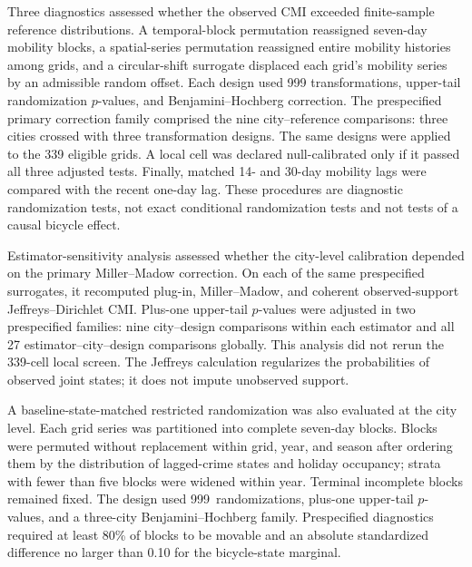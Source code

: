 \documentclass[applsci,article,accept,moreauthors]{Definitions/mdpi}
\begin{document}
Three diagnostics assessed whether the observed CMI exceeded finite-sample
reference distributions. A temporal-block permutation reassigned seven-day mobility
blocks, a spatial-series permutation reassigned entire mobility histories
among grids, and a circular-shift surrogate displaced each grid's mobility
series by an admissible random offset. Each design used 999 transformations,
upper-tail randomization \(p\)-values, and Benjamini--Hochberg correction.
{The prespecified primary correction family comprised the nine
city--reference comparisons: three cities crossed with three transformation
designs.}
The same designs were applied to the 339 eligible grids. A local cell
was declared null-calibrated only if it passed all three adjusted tests.
Finally, matched 14- and 30-day mobility lags were compared with the recent
one-day lag. These procedures are diagnostic randomization tests, not exact
conditional randomization tests and not tests of a causal bicycle effect.

Estimator-sensitivity analysis assessed whether the city-level calibration
depended on the primary Miller--Madow correction. On each of the same
prespecified surrogates, it
recomputed plug-in, Miller--Madow, and coherent observed-support
Jeffreys--Dirichlet CMI. Plus-one upper-tail \(p\)-values were adjusted in
two prespecified families: nine city--design comparisons within each
estimator and all 27 estimator--city--design comparisons globally. This
analysis did not rerun the 339-cell local screen. The Jeffreys calculation regularizes
the probabilities of observed joint states; it does not impute
unobserved support.

A baseline-state-matched restricted randomization was also evaluated at the
city level. Each grid series was partitioned into complete seven-day blocks.
Blocks were permuted without replacement within grid, year, and season
after ordering them by the distribution of lagged-crime states and holiday
occupancy; strata with fewer than five blocks were widened within year.
Terminal incomplete blocks remained fixed. The design used 999~randomizations, plus-one upper-tail \(p\)-values, and a three-city
Benjamini--Hochberg family. Prespecified diagnostics required at least 80\%
of blocks to be movable and an absolute standardized difference no larger
than 0.10 for the bicycle-state marginal.
\end{document}
